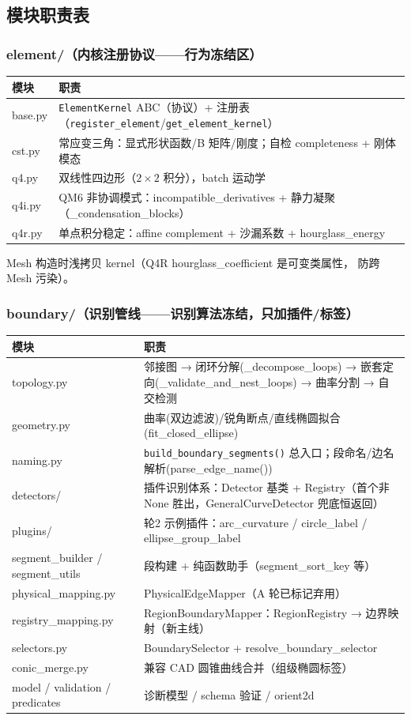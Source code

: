 \documentclass[12pt,a4paper]{ctexart}
\newcommand{\fem}{\Verb}
\begin{document}
\subsection{模块职责表}

\subsubsection{element/（内核注册协议——行为冻结区）}

\begin{longtable}{p{4.0cm}p{11.4cm}}
\toprule
\textbf{模块} & \textbf{职责} \\
\midrule
base.py & \fem|ElementKernel| ABC（协议）+ 注册表（\fem|register_element|/\fem|get_element_kernel|）\\
cst.py & 常应变三角：显式形状函数/B 矩阵/刚度；自检 completeness + 刚体模态 \\
q4.py & 双线性四边形（$2\times2$ 积分），batch 运动学 \\
q4i.py & QM6 非协调模式：incompatible\_derivatives + 静力凝聚（\_condensation\_blocks） \\
q4r.py & 单点积分稳定：affine complement + 沙漏系数 + hourglass\_energy \\
\bottomrule
\end{longtable}

Mesh 构造时浅拷贝 kernel（Q4R hourglass\_coefficient 是可变类属性，
防跨 Mesh 污染）。

\subsubsection{boundary/（识别管线——识别算法冻结，只加插件/标签）}

\begin{longtable}{p{4.0cm}p{11.4cm}}
\toprule
\textbf{模块} & \textbf{职责} \\
\midrule
topology.py & 邻接图 → 闭环分解(\_decompose\_loops) → 嵌套定向(\_validate\_and\_nest\_loops) → 曲率分割 → 自交检测 \\
geometry.py & 曲率(双边滤波)/锐角断点/直线椭圆拟合(fit\_closed\_ellipse) \\
naming.py & \fem|build_boundary_segments()| 总入口；段命名/边名解析(parse\_edge\_name()) \\
detectors/ & 插件识别体系：Detector 基类 + Registry（首个非 None 胜出，GeneralCurveDetector 兜底恒返回） \\
plugins/ & 轮2 示例插件：arc\_curvature / circle\_label / ellipse\_group\_label \\
segment\_builder / segment\_utils & 段构建 + 纯函数助手（segment\_sort\_key 等） \\
physical\_mapping.py & PhysicalEdgeMapper（A 轮已标记弃用） \\
registry\_mapping.py & RegionBoundaryMapper：RegionRegistry → 边界映射（新主线） \\
selectors.py & BoundarySelector + resolve\_boundary\_selector \\
conic\_merge.py & 兼容 CAD 圆锥曲线合并（组级椭圆标签） \\
model / validation / predicates & 诊断模型 / schema 验证 / orient2d \\
\bottomrule
\end{longtable}
\end{document}
